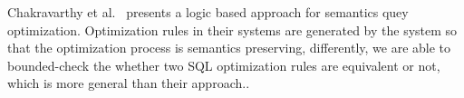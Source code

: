 \documentclass{article}
\begin{document}
Chakravarthy et al.~\cite{Chakravarthy:1990:LAS:78922.78924} presents a logic based approach for semantics quey optimization. Optimization rules in their systems are generated by the system so that the optimization process is semantics preserving, differently, we are able to bounded-check the whether two SQL optimization rules are equivalent or not, which is more general than their approach..

{}

\end{document}
